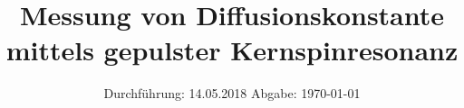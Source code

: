 

\subject{V-49}
\title{Messung von Diffusionskonstante mittels gepulster Kernspinresonanz}
\date{
  Durchführung: 14.05.2018
  \hspace{3em}
  Abgabe: \today
}



\maketitle
\thispagestyle{empty}
\tableofcontents
\newpage






\printbibliography


